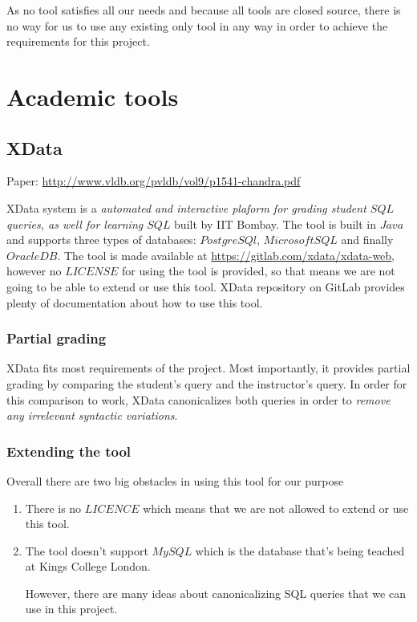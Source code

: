 As no tool satisfies all our needs and because all tools are closed source, there is no way for us to use any existing only tool in any way in order to achieve the requirements for this project.

\section{Academic tools}
\subsection{XData}
Paper: \url{http://www.vldb.org/pvldb/vol9/p1541-chandra.pdf}

XData system is a \textit{automated and interactive plaform for grading student $SQL$ queries, as well for learning $SQL$} built by IIT Bombay. The tool is built in $Java$ and supports three types of databases: $PostgreSQl$, $Microsoft SQL$ and finally $Oracle DB$. The tool is made available at \url{https://gitlab.com/xdata/xdata-web}, however no $LICENSE$ for using the tool is provided, so that means we are not going to be able to extend or use this tool. XData repository on GitLab provides plenty of documentation about how to use this tool.

\subsubsection*{Partial grading}

XData fits most requirements of the project. Most importantly, it provides partial grading by comparing the student's query and the instructor's query. In order for this comparison to work, XData canonicalizes both queries in order to \textit{remove any irrelevant syntactic variations}.

\subsubsection*{Extending the tool}

Overall there are two big obstacles in using this tool for our purpose
\begin{enumerate}
    \item There is no $LICENCE$ which means that we are not allowed to extend or use this tool.
    \item The tool doesn't support $MySQL$ which is the database that's being teached at Kings College London.

However, there are many ideas about canonicalizing SQL queries that we can use in this project.
\end{enumerate}

